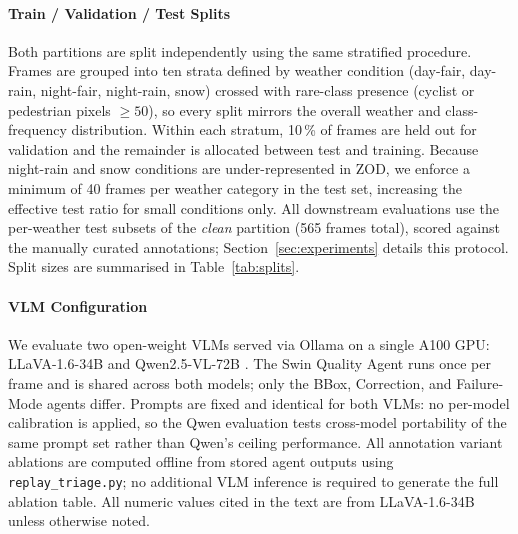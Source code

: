 \documentclass[conference]{IEEEtran}
\begin{document}



\paragraph{Train / Validation / Test Splits}
Both partitions are split independently using the same stratified procedure.
Frames are grouped into ten strata defined by weather condition (day-fair, day-rain, night-fair, night-rain, snow) crossed with rare-class presence (cyclist or pedestrian pixels $\geq 50$), so every split mirrors the overall weather and class-frequency distribution.
Within each stratum, 10\,\% of frames are held out for validation and the remainder is allocated between test and training.
Because night-rain and snow conditions are under-represented in ZOD, we enforce a minimum of 40 frames per weather category in the test set, increasing the effective test ratio for small conditions only.
All downstream evaluations use the per-weather test subsets of the \emph{clean} partition (565 frames total), scored against the manually curated annotations; Section~\ref{sec:experiments} details this protocol.
Split sizes are summarised in Table~\ref{tab:splits}.



\paragraph{VLM Configuration}
We evaluate two open-weight VLMs served via Ollama on a single A100 GPU: LLaVA-1.6-34B \cite{liu2024llava} and Qwen2.5-VL-72B \cite{bai2025qwen25vl}.
The Swin Quality Agent runs once per frame and is shared across both models; only the BBox, Correction, and Failure-Mode agents differ.
Prompts are fixed and identical for both VLMs: no per-model calibration is applied, so the Qwen evaluation tests cross-model portability of the same prompt set rather than Qwen's ceiling performance.
All annotation variant ablations are computed offline from stored agent outputs using \texttt{replay\_triage.py}; no additional VLM inference is required to generate the full ablation table.
All numeric values cited in the text are from LLaVA-1.6-34B unless otherwise noted.
\end{document}
